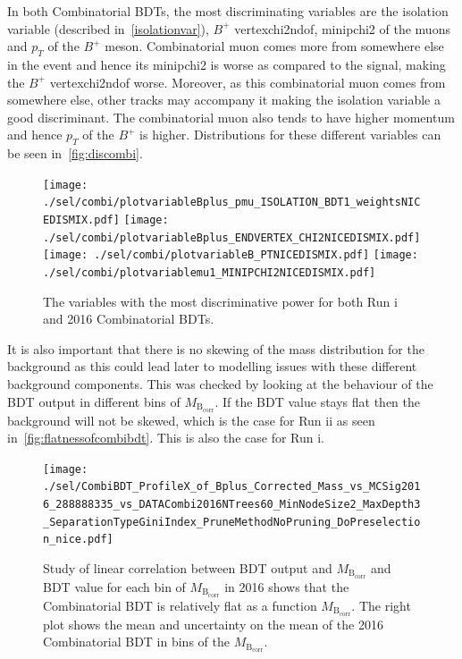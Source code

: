 In both Combinatorial BDTs, the most discriminating variables are the isolation variable (described in~\autoref{isolationvar}), $B^{+}$ \gls{vertexchi2ndof}, \gls{minipchi2} of the muons and $p_{T}$ of the $B^{+}$ meson. Combinatorial muon comes more from somewhere else in the event and hence its \gls{minipchi2} is worse as compared to the signal, making the $B^{+}$ \gls{vertexchi2ndof} worse. Moreover, as this combinatorial muon comes from somewhere else, other tracks may accompany it making the isolation variable a good discriminant. The combinatorial muon also tends to have higher momentum and hence $p_{T}$ of the $B^{+}$ is higher. Distributions for these different variables can be seen in~\autoref{fig:discombi}. 


\begin{figure}[ht]
\centering
	\texttt{[image: ./sel/combi/plotvariableBplus\_pmu\_ISOLATION\_BDT1\_weightsNICEDISMIX.pdf]}%
	\texttt{[image: ./sel/combi/plotvariableBplus\_ENDVERTEX\_CHI2NICEDISMIX.pdf]}%
	\newline
	\texttt{[image: ./sel/combi/plotvariableB\_PTNICEDISMIX.pdf]}%
	\texttt{[image: ./sel/combi/plotvariablemu1\_MINIPCHI2NICEDISMIX.pdf]}%
	\caption{The variables with the most discriminative power for both Run \Rn{1} and 2016 Combinatorial BDTs.}
\label{fig:discombi}
\end{figure}


It is also important that there is no skewing of the mass distribution for the background as this could lead later to modelling issues with these different background components. This was checked by looking at the behaviour of the BDT output in different bins of $M_{\mathrm{B_{corr}}}$. If the BDT value stays flat then the background will not be skewed, which is the case for Run \Rn{2} as seen in~\autoref{fig:flatnessofcombibdt}. This is also the case for Run \Rn{1}. 


\begin{figure}[ht]
\centering
	\texttt{[image: ./sel/CombiBDT\_ProfileX\_of\_Bplus\_Corrected\_Mass\_vs\_MCSig2016\_288888335\_vs\_DATACombi2016NTrees60\_MinNodeSize2\_MaxDepth3\_SeparationTypeGiniIndex\_PruneMethodNoPruning\_DoPreselection\_nice.pdf]}
	\caption{Study of linear correlation between BDT output and $M_{\mathrm{B_{corr}}}$ and BDT value for each bin of $M_{\mathrm{B_{corr}}}$ in 2016 shows that the Combinatorial BDT is relatively flat as a function $M_{\mathrm{B_{corr}}}$. The right plot shows the mean and uncertainty on the mean of the 2016 Combinatorial BDT in bins of the $M_{\mathrm{B_{corr}}}$.}%
\label{fig:flatnessofcombibdt}
\end{figure}


